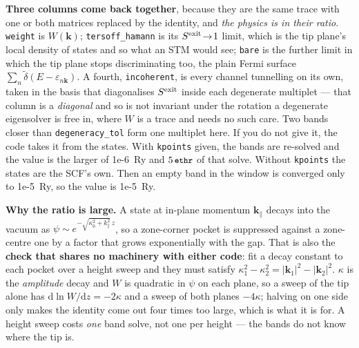 \documentclass[11pt,a4paper]{article}
\newcommand{\code}[1]{\texttt{\small #1}}
\begin{document}
\textbf{Three columns come back together}, because they are the same trace with
one or both matrices replaced by the identity, and \emph{the physics is in their
ratio}. \code{weight} is $W(\mathbf k)$; \code{tersoff\_hamann} is its
$S^{\rm exit}\!\to\!1$ limit, which is the tip plane's local density of states
and so what an STM would see; \code{bare} is the further limit in which the tip
plane stops discriminating too, the plain Fermi surface
$\sum_n \tilde\delta(E - \varepsilon_{n\mathbf k})$. A fourth,
\code{incoherent}, is every channel tunnelling on its own, taken in the basis
that diagonalises $S^{\rm exit}$ inside each degenerate multiplet --- that
column is a \emph{diagonal} and so is not invariant under the rotation a
degenerate eigensolver is free in, where $W$ is a trace and needs no such care.
Two bands closer than \code{degeneracy\_tol} form one multiplet here. If you do
not give it, the code takes it from the states. With \code{kpoints} given, the
bands are re-solved and the value is the larger of 1e-6~Ry and $5\,\code{ethr}$
of that solve. Without \code{kpoints} the states are the SCF's own. Then an
empty band in the window is converged only to 1e-5~Ry, so the value is 1e-5~Ry.

\textbf{Why the ratio is large.} A state at in-plane momentum
$\mathbf k_\parallel$ decays into the vacuum as
$\psi \sim e^{-\sqrt{\kappa_0^2 + k_\parallel^2}\, z}$, so a zone-corner pocket
is suppressed against a zone-centre one by a factor that grows exponentially
with the gap. That is also the \textbf{check that shares no machinery with
either code}: fit a decay constant to each pocket over a height sweep and they
must satisfy $\kappa_1^2 - \kappa_2^2 = |\mathbf k_1|^2 - |\mathbf k_2|^2$.
$\kappa$ is the \emph{amplitude} decay and $W$ is quadratic in $\psi$ on each
plane, so a sweep of the tip alone has $\mathrm{d}\ln W/\mathrm{d}z = -2\kappa$
and a sweep of both planes $-4\kappa$; halving on one side only makes the
identity come out four times too large, which is what it is for. A height sweep
costs \emph{one} band solve, not one per height --- the bands do not know where
the tip is.
\end{document}
